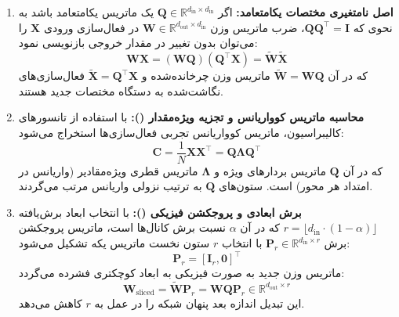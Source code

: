 \begin{enumerate}
    \item \textbf{اصل نامتغیری مختصات یکامتعامد:}
    اگر $\mathbf{Q} \in \mathbb{R}^{d_{\text{in}} \times d_{\text{in}}}$ یک ماتریس یکامتعامد باشد به نحوی که $\mathbf{Q} \mathbf{Q}^\top = \mathbf{I}$، ضرب ماتریس وزن $\mathbf{W} \in \mathbb{R}^{d_{\text{out}} \times d_{\text{in}}}$ در فعال‌سازی ورودی $\mathbf{X}$ را می‌توان بدون تغییر در مقدار خروجی بازنویسی نمود:
    \begin{equation}
    \mathbf{W} \mathbf{X} = (\mathbf{W} \mathbf{Q}) (\mathbf{Q}^\top \mathbf{X}) = \tilde{\mathbf{W}} \tilde{\mathbf{X}}
    \end{equation}
    که در آن $\tilde{\mathbf{W}} = \mathbf{W} \mathbf{Q}$ ماتریس وزن چرخانده‌شده و $\tilde{\mathbf{X}} = \mathbf{Q}^\top \mathbf{X}$ فعال‌سازی‌های نگاشت‌شده به دستگاه مختصات جدید هستند.

    \item \textbf{محاسبه ماتریس کوواریانس و تجزیه ویژه‌مقدار ():}
    با استفاده از تانسورهای کالیبراسیون، ماتریس کوواریانس تجربی فعال‌سازی‌ها استخراج می‌شود:
    \begin{equation}
    \mathbf{C} = \frac{1}{N} \mathbf{X} \mathbf{X}^\top = \mathbf{Q} \mathbf{\Lambda} \mathbf{Q}^\top
    \end{equation}
    که در آن $\mathbf{Q}$ ماتریس بردارهای ویژه و $\mathbf{\Lambda}$ ماتریس قطری ویژه‌مقادیر (واریانس در امتداد هر محور) است. ستون‌های $\mathbf{Q}$ به ترتیب نزولی واریانس مرتب می‌گردند.

    \item \textbf{برش ابعادی و پروجکشن فیزیکی ():}
    با انتخاب ابعاد برش‌یافته $r = \lfloor d_{\text{in}} \cdot (1 - \alpha) \rfloor$ که در آن $\alpha$ نسبت برش کانال‌ها است، ماتریس پروجکشن برش $\mathbf{P}_r \in \mathbb{R}^{d_{\text{in}} \times r}$ با انتخاب $r$ ستون نخست ماتریس یکه تشکیل می‌شود:
    \begin{equation}
    \mathbf{P}_r = [\mathbf{I}_r, \mathbf{0}]^\top
    \end{equation}
    ماتریس وزن جدید به صورت فیزیکی به ابعاد کوچکتری فشرده می‌گردد:
    \begin{equation}
    \mathbf{W}_{\text{sliced}} = \tilde{\mathbf{W}} \mathbf{P}_r = \mathbf{W} \mathbf{Q} \mathbf{P}_r \in \mathbb{R}^{d_{\text{out}} \times r}
    \end{equation}
    این تبدیل اندازه بعد پنهان شبکه را در عمل به $r$ کاهش می‌دهد.
\end{enumerate}

